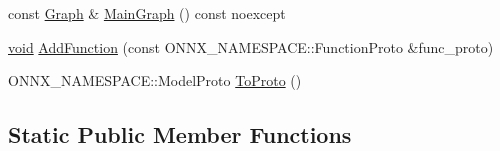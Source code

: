 \begin{DoxyCompactItemize}
\item 
const \mbox{\hyperlink{classonnxruntime_1_1Graph}{Graph}} \& \mbox{\hyperlink{classonnxruntime_1_1Model_a2a97e4baaf0238d56a4c1f583c3430ab}{Main\+Graph}} () const noexcept
\item 
\mbox{\hyperlink{mlasi_8h_a88f941d423cb2a819b70a1358982b1a6}{void}} \mbox{\hyperlink{classonnxruntime_1_1Model_a602e428a4b098e7ec95f5a05144b06f5}{Add\+Function}} (const O\+N\+N\+X\+\_\+\+N\+A\+M\+E\+S\+P\+A\+C\+E\+::\+Function\+Proto \&func\+\_\+proto)
\item 
O\+N\+N\+X\+\_\+\+N\+A\+M\+E\+S\+P\+A\+C\+E\+::\+Model\+Proto \mbox{\hyperlink{classonnxruntime_1_1Model_a6548029afd30cb62977066de5f70cb90}{To\+Proto}} ()
\end{DoxyCompactItemize}
\subsection*{Static Public Member Functions}
